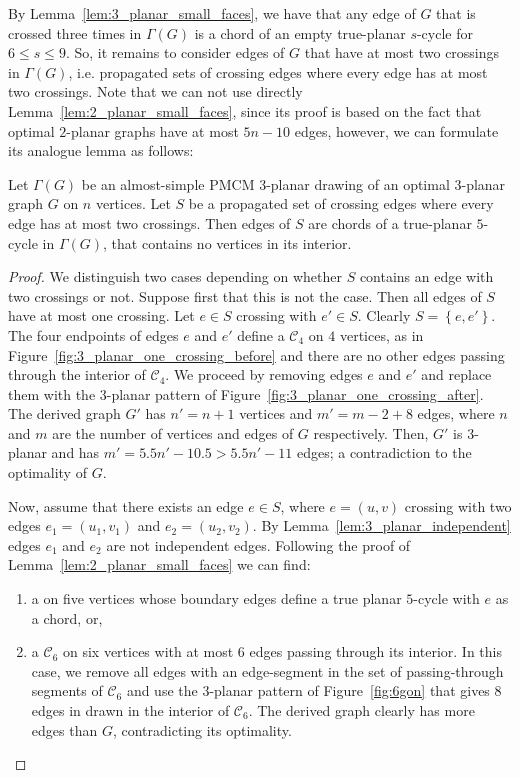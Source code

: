 By Lemma~\ref{lem:3_planar_small_faces}, we have that any edge of $G$ that is crossed three times in $\Gamma(G)$ is a chord of an empty true-planar $s$-cycle for $6\leq s\leq9$. So, it remains to consider edges of $G$ that have at most two crossings in $\Gamma(G)$, i.e. propagated sets of crossing edges where every edge has at most two crossings. Note that we can not use directly  Lemma~\ref{lem:2_planar_small_faces}, since its proof is based on the fact that optimal $2$-planar graphs have at most $5n-10$ edges, however, we can formulate its analogue lemma as follows:
\begin{lemma}
Let $\Gamma(G)$ be an almost-simple PMCM $3$-planar drawing of an optimal $3$-planar graph $G$ on $n$ vertices. Let $S$ be a propagated set of crossing edges where every edge has at most two crossings. Then edges of $S$ are chords of a true-planar $5$-cycle in $\Gamma(G)$, that contains no vertices in its interior. 
\label{lem:3_planar_small_faces_2}
\end{lemma}
\begin{proof}
We distinguish two cases depending on whether $S$ contains an edge with two crossings or not. Suppose first that this is not the case. Then all edges of $S$ have at most one crossing. Let $e\in S$ crossing with $e'\in S$. Clearly $S=\left\{e,e'\right\}$. The four endpoints of edges $e$ and $e'$ define a \pp $\mathcal{C}_4$ on $4$ vertices, as in Figure~\ref{fig:3_planar_one_crossing_before} and there are no other edges passing through the interior of $\mathcal{C}_4$. We proceed by removing edges $e$ and $e'$ and replace them with the $3$-planar pattern of Figure~\ref{fig:3_planar_one_crossing_after}. The derived graph $G'$ has $n'=n+1$ vertices and $m'=m-2+8$ edges, where $n$ and $m$ are the number of vertices and edges of $G$ respectively. Then, $G'$ is $3$-planar and has $m'=5.5n'-10.5>5.5n'-11$ edges; a contradiction to the optimality of $G$.

Now, assume that there exists an edge $e\in S$, where $e=(u,v)$ crossing with two edges $e_1=(u_1,v_1)$ and $e_2=(u_2,v_2)$. By Lemma~\ref{lem:3_planar_independent} edges $e_1$ and $e_2$ are not independent edges. Following the proof of Lemma~\ref{lem:2_planar_small_faces} we can find:
\begin{enumerate}
\item  a \pp on five vertices whose boundary edges define a true planar $5$-cycle with $e$ as a chord, or,
\item a \pp $\mathcal{C}_6$ on six vertices with at most $6$ edges passing through its interior. In this case, we remove all edges with an edge-segment in the set of passing-through segments of $\mathcal{C}_6$ and use the $3$-planar pattern of Figure~\ref{fig:6gon} that gives $8$ edges in drawn in the interior of $\mathcal{C}_6$. The derived graph clearly has more edges than $G$, contradicting its optimality.
\end{enumerate}
\end{proof}

